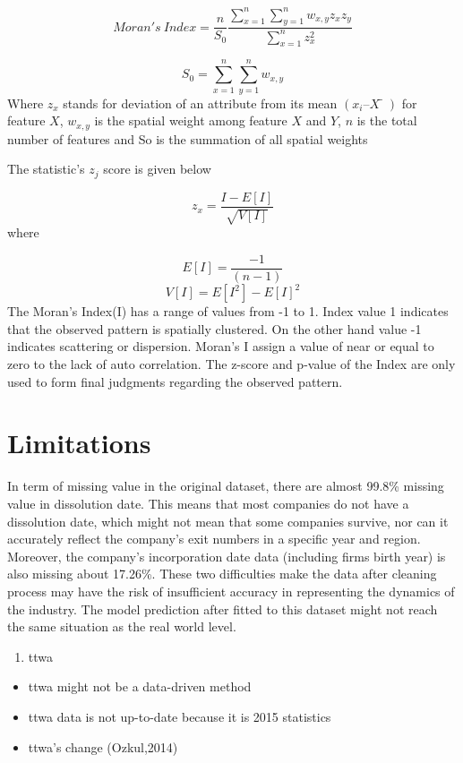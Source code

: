 \documentclass[
  12pt,
  oneside]{book}
\providecommand{\tightlist}{%
  \setlength{\itemsep}{0pt}\setlength{\parskip}{0pt}}
\begin{document}
\[ Moran's \ Index = \frac{n}{S_0} \frac{\sum_{x=1}^n \sum_{y=1}^n w_{x,y} z_x z_y}{\sum_{x=1}^n z_x^2}\]

\[ S_0 = \sum_{x=1}^n \sum_{y=1}^n w_{x,y}\]
Where \(z_x\) stands for deviation of an attribute from its mean \((x_i – X̅)\) for feature \(X\), \(w_{x,y}\) is the spatial weight among feature \(X\) and \(Y\), \(n\) is the total number of features and So is the summation of all spatial weights

The statistic's \(z_j\) score is given below

\[ z_x = \frac{I - E[I]}{\sqrt{V[I]}}\]
where

\[ E[I] = \frac{-1}{(n-1)}\]
\[ V[I] = E[I^2]-E[I]^2\]
The Moran's Index(I) has a range of values from -1 to 1. Index value 1 indicates that the observed pattern is spatially clustered. On the other hand value -1 indicates scattering or dispersion. Moran's I assign a value of near or equal to zero to the lack of auto correlation. The z-score and p-value of the Index are only used to form final judgments regarding the observed pattern.

\hypertarget{limitations}{%
\section{Limitations}\label{limitations}}

In term of missing value in the original dataset, there are almost 99.8\% missing value in dissolution date. This means that most companies do not have a dissolution date, which might not mean that some companies survive, nor can it accurately reflect the company's exit numbers in a specific year and region. Moreover, the company's incorporation date data (including firms birth year) is also missing about 17.26\%. These two difficulties make the data after cleaning process may have the risk of insufficient accuracy in representing the dynamics of the industry. The model prediction after fitted to this dataset might not reach the same situation as the real world level.

\begin{enumerate}
\def\labelenumi{\arabic{enumi}.}
\tightlist
\item
  ttwa
\end{enumerate}

\begin{itemize}
\tightlist
\item
  ttwa might not be a data-driven method
\item
  ttwa data is not up-to-date because it is 2015 statistics
\item
  ttwa's change (Ozkul,2014)
\end{itemize}
\end{document}
